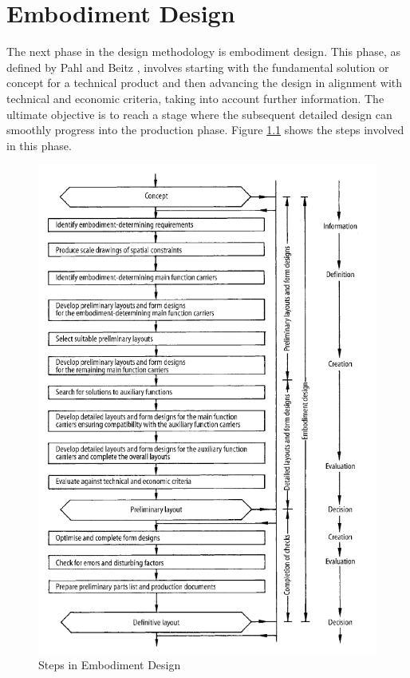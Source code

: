 \chapter{Embodiment Design}
The next phase in the design methodology is embodiment design. This phase, as defined by Pahl and Beitz \cite{Pahl07t}, involves starting with the fundamental solution or concept for a technical product and then advancing the design in alignment with technical and economic criteria, taking into account further information. The ultimate objective is to reach a stage where the subsequent detailed design can smoothly progress into the production phase.
Figure \ref{fig:embodiment_design} shows the steps involved in this phase.

\begin{figure}
    \centering
    \includegraphics[width=0.92\linewidth]{texs/Part1/chapter4/image/embodiment.png}
    \caption{Steps in Embodiment Design \cite{Pahl07u}}
    \label{fig:embodiment_design}
\end{figure}

